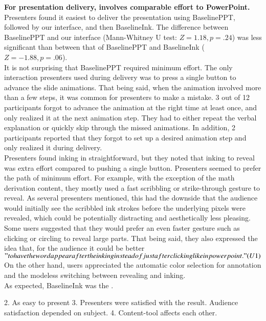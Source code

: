 \textbf{For presentation delivery, \interface involves comparable effort to PowerPoint.}\\
Presenters found it easiest to deliver the presentation using BaselinePPT, followed by our interface, and then BaselineInk. The difference between BaselinePPT and our interface (Mann-Whitney U test: $Z = 1.18, p = .24$) was less significant than between that of BaselinePPT and BaselineInk ($Z = -1.88, p = .06$). \\
It is not surprising that BaselinePPT required minimum effort. The only interaction presenters used during delivery was to press a single button to advance the slide animations. That being said, when the animation involved more than a few steps, it was common for presenters to make a mistake. 3 out of 12 participants forgot to advance the animation at the right time at least once, and only realized it at the next animation step. They had to either repeat the verbal explanation or quickly skip through the missed animations. In addition, 2 participants reported that they forgot to set up a desired animation step and only realized it during delivery. \\
Presenters found inking in \interface straightforward, but they noted that inking to reveal was extra effort compared to pushing a single button. Presenters seemed to prefer the path of minimum effort. For example, with the exception of the math derivation content, they mostly used a fast scribbling or strike-through gesture to reveal. As several presenters mentioned, this had the downside that the audience would initially see the scribbled ink strokes before the underlying pixels were revealed, which could be potentially distracting and aesthetically less pleasing. Some users suggested that they would prefer an even faster gesture such as clicking or circling to reveal large parts. That being said, they also expressed the idea that, for the audience it could be better  $"to have the word appear after the inking instead of just after clicking like in powerpoint." (U1)$   On the other hand, users appreciated the automatic color selection for annotation and the modeless switching between revealing and inking. \\
As expected, BaselineInk was the . 


2. As easy to present
3. Presenters were satisfied with the result. Audience satisfaction depended on subject. 
4. Content-tool affects each other.
